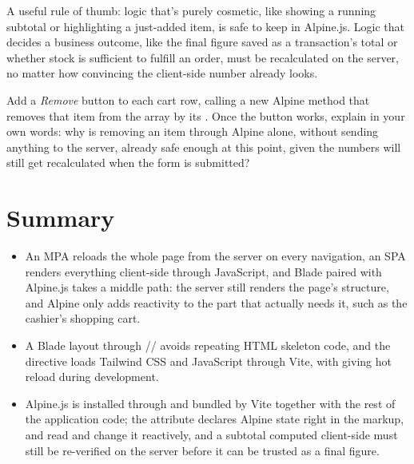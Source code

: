 \begin{tipbox}
A useful rule of thumb: logic that's purely cosmetic, like showing a
running subtotal or highlighting a just-added item, is safe to keep in
Alpine.js. Logic that decides a business outcome, like the final figure
saved as a transaction's total or whether stock is sufficient to fulfill
an order, must be recalculated on the server, no matter how convincing the
client-side number already looks.
\end{tipbox}

\begin{challengebox}
Add a \textit{Remove} button to each cart row, calling a new Alpine method
that removes that item from the  array by its . Once the
button works, explain in your own words: why is removing an item through
Alpine alone, without sending anything to the server, already safe enough
at this point, given the numbers will still get recalculated when the form
is submitted?
\end{challengebox}


\section{Summary}
\label{sec:blade-dan-tailwind-rangkuman}

\begin{itemize}
  \item An MPA reloads the whole page from the server on every navigation,
    an SPA renders everything client-side through JavaScript, and Blade
    paired with Alpine.js takes a middle path: the server still renders
    the page's structure, and Alpine only adds reactivity to the part that
    actually needs it, such as the cashier's shopping cart.
  \item A Blade layout through //
    avoids repeating HTML skeleton code, and the  directive
    loads Tailwind CSS and JavaScript through Vite, with 
    giving hot reload during development.
  \item Alpine.js is installed through  and
    bundled by Vite together with the rest of the application code; the
     attribute declares Alpine state right in the markup,
     and  read and change it reactively, and a
    subtotal computed client-side must still be re-verified on the server
    before it can be trusted as a final figure.
\end{itemize}

